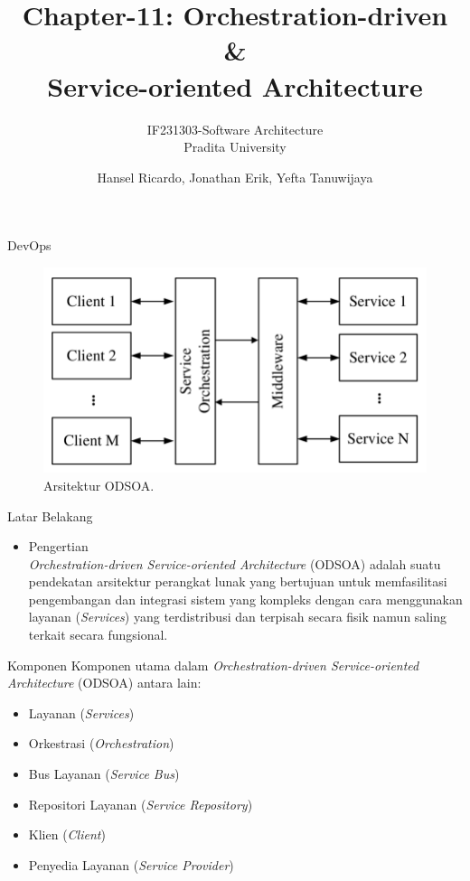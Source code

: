 \documentclass[aspectratio=169, table]{beamer}
\title{Chapter-11: Orchestration-driven \&\\ Service-oriented Architecture}
\subtitle{IF231303-Software Architecture\\Pradita University}
\author{Hansel Ricardo, Jonathan Erik, Yefta Tanuwijaya}
\begin{document}
	
	\begin{frame}[plain]
		\maketitle
	\end{frame}
	
	\begin{frame}{DevOps}
		\begin{figure}[h]
			\centering
			\includegraphics[width=\textwidth]{ODSOA}
			\caption{Arsitektur ODSOA.}
			\label{fig:Arsitektur ODSOA}
		\end{figure}
	\end{frame}
	
	\begin{frame}{Latar Belakang}
		\begin{itemize}
			\item Pengertian
			\\\textit{Orchestration-driven Service-oriented Architecture} (ODSOA) adalah suatu pendekatan arsitektur perangkat lunak yang bertujuan untuk memfasilitasi pengembangan dan integrasi sistem yang kompleks dengan cara menggunakan layanan (\textit{Services}) yang terdistribusi dan terpisah secara fisik namun saling terkait secara fungsional.
		\end{itemize}
	\end{frame}
	
	\begin{frame}{Komponen}
		Komponen utama dalam \textit{Orchestration-driven Service-oriented Architecture} (ODSOA) antara lain:
		\begin{itemize}
			\item Layanan (\textit{Services})
			\item Orkestrasi (\textit{Orchestration})
			\item Bus Layanan (\textit{Service Bus})
			\item Repositori Layanan (\textit{Service Repository})
			\item Klien (\textit{Client})
			\item Penyedia Layanan (\textit{Service Provider})
			
		\end{itemize}
	\end{frame}
	
\end{document}
